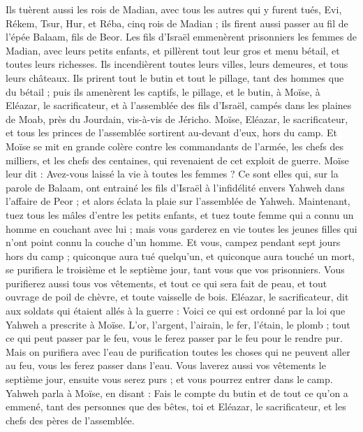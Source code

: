 \begin{multicols}{2}
Ils tuèrent aussi les rois de Madian, avec tous les autres qui y furent tués, Evi, Rékem, Tsur, Hur, et Réba, cinq rois de Madian ; ils firent aussi passer au fil de l'épée Balaam, fils de Beor.
Les fils d'Israël emmenèrent prisonniers les femmes de Madian, avec leurs petits enfants, et pillèrent tout leur gros et menu bétail, et toutes leurs richesses.
Ils incendièrent toutes leurs villes, leurs demeures, et tous leurs châteaux.
Ils prirent tout le butin et tout le pillage, tant des hommes que du bétail ;
puis ils amenèrent les captifs, le pillage, et le butin, à Moïse, à Eléazar, le sacrificateur, et à l'assemblée des fils d'Israël, campés dans les plaines de Moab, près du Jourdain, vis-à-vis de Jéricho.
Moïse, Eléazar, le sacrificateur, et tous les princes de l'assemblée sortirent au-devant d'eux, hors du camp.
Et Moïse se mit en grande colère contre les commandants de l'armée, les chefs des milliers, et les chefs des centaines, qui revenaient de cet exploit de guerre.
Moïse leur dit : Avez-vous laissé la vie à toutes les femmes ?
Ce sont elles qui, sur la parole de Balaam, ont entrainé les fils d'Israël à l’infidélité envers Yahweh dans l’affaire de Peor ; et alors éclata la plaie sur l'assemblée de Yahweh.
Maintenant, tuez tous les mâles d'entre les petits enfants, et tuez toute femme qui a connu un homme en couchant avec lui ;
mais vous garderez en vie toutes les jeunes filles qui n'ont point connu la couche d’un homme.
Et vous, campez pendant sept jours hors du camp ; quiconque aura tué quelqu'un, et quiconque aura touché un mort, se purifiera le troisième et le septième jour, tant vous que vos prisonniers.
Vous purifierez aussi tous vos vêtements, et tout ce qui sera fait de peau, et tout ouvrage de poil de chèvre, et toute vaisselle de bois.
Eléazar, le sacrificateur, dit aux soldats qui étaient allés à la guerre : Voici ce qui est ordonné par la loi que Yahweh a prescrite à Moïse.
L'or, l'argent, l'airain, le fer, l'étain, le plomb ;
tout ce qui peut passer par le feu, vous le ferez passer par le feu pour le rendre pur. Mais on purifiera avec l'eau de purification toutes les choses qui ne peuvent aller au feu, vous les ferez passer dans l’eau.
Vous laverez aussi vos vêtements le septième jour, ensuite vous serez purs ; et vous pourrez entrer dans le camp.
Yahweh parla à Moïse, en disant :
Fais le compte du butin et de tout ce qu'on a emmené, tant des personnes que des bêtes, toi et Eléazar, le sacrificateur, et les chefs des pères de l'assemblée.

\end{multicols}
